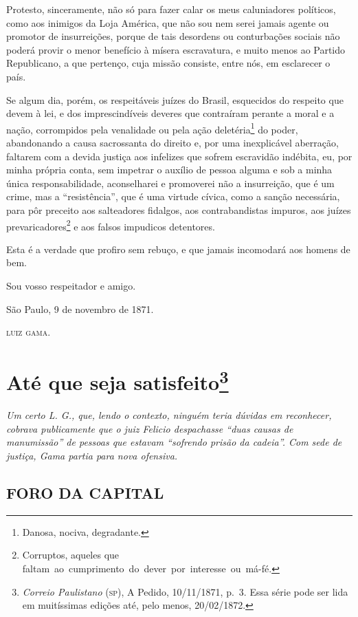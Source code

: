 {Protesto, sinceramente, não só para fazer calar os meus caluniadores
políticos, como aos inimigos da Loja América, que não sou nem serei
jamais agente ou promotor de insurreições, porque de tais desordens ou
conturbações sociais não poderá provir o menor benefício à mísera
escravatura, e muito menos ao Partido Republicano, a que pertenço, cuja
missão consiste, entre nós, em esclarecer o país.

Se algum dia, porém, os respeitáveis juízes do Brasil, esquecidos do
respeito que devem à lei, e dos imprescindíveis deveres que contraíram
perante a moral e a nação, corrompidos pela venalidade ou pela ação
deletéria\footnote{ Danosa, nociva, degradante.} do poder, abandonando
a causa sacrossanta do direito e, por uma inexplicável aberração,
faltarem com a devida justiça aos infelizes que sofrem escravidão
indébita, eu, por minha própria conta, sem impetrar o auxílio de pessoa
alguma e sob a minha única responsabilidade, aconselharei e promoverei
não a insurreição, que é um crime, mas a ``resistência'', que é uma
virtude cívica, como a sanção necessária, para pôr preceito aos
salteadores fidalgos, aos contrabandistas impuros, aos juízes
prevaricadores\footnote{ Corruptos, aqueles que
  faltam~ao~cumprimento~do~dever~por~interesse~ou~má-fé.} e aos falsos
impudicos detentores.

Esta é a verdade que profiro sem rebuço, e que jamais incomodará aos
homens de bem.

Sou vosso respeitador e amigo.

São Paulo, 9 de novembro de 1871.

\textsc{luiz gama}.

\chapter{Até que seja satisfeito\footnote{\emph{Correio Paulistano} (\textsc{sp}), A Pedido, 10/11/1871,
  p.~3. Essa série pode ser lida em muitíssimas edições até, pelo menos,
  20/02/1872.}} %

\begin{didascalia}
\emph{Um certo L. G., que, lendo o contexto, ninguém teria dúvidas em
reconhecer, cobrava publicamente que o juiz Felicio despachasse ``duas
causas de manumissão'' de pessoas que estavam ``sofrendo prisão da
cadeia''. Com sede de justiça, Gama partia para nova ofensiva.}
\end{didascalia}


\section{FORO DA CAPITAL}

}

